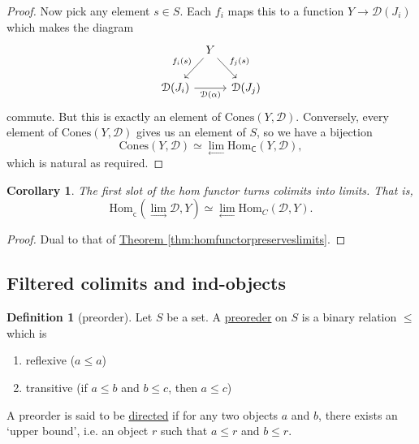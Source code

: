 \documentclass[a4paper,10pt]{scrreprt}
\newcommand{\defn}[1]{\ul{#1}}
\newcommand{\Hom}{\mathrm{Hom}}
\theoremstyle{definition}
\newtheorem{definition}{Definition}[section]
\theoremstyle{plain}
\newtheorem{corollary}{Corollary}[section]
\theoremstyle{remark}
\begin{document}
\begin{proof}
  Now pick any element $s \in S$. Each $f_{i}$ maps this to a function $Y \to \mathcal{D}(J_{i})$ which makes the diagram
  \begin{equation*}
    \begin{tikzcd}[column sep=tiny]
      & Y
      \arrow[dl, swap, "f_{i}(s)"]
      \arrow[dr, "f_{j}(s)"]
      \\
      \mathcal{D}(J_{i})
      \arrow[rr, swap, "\mathcal{D}(\alpha)"]
      & & \mathcal{D}(J_{j})
    \end{tikzcd}
  \end{equation*}
  commute. But this is exactly an element of $\mathrm{Cones}(Y, \mathcal{D})$. Conversely, every element of $\mathrm{Cones}(Y, \mathcal{D})$ gives us an element of $S$, so we have a bijection 
  \begin{equation*}
    \mathrm{Cones}(Y, \mathcal{D}) \simeq \lim_{\leftarrow} \Hom_{\mathsf{C}}(Y, \mathcal{D}),
  \end{equation*}
  which is natural as required.
\end{proof}

\begin{corollary}
  The first slot of the hom functor turns colimits into limits. That is, 
  \begin{equation*}
    \Hom_{_\mathsf{C}}(\lim_{\rightarrow}\mathcal{D}, Y) \simeq \lim_{\leftarrow}\Hom_{C}(\mathcal{D}, Y).
  \end{equation*}
\end{corollary}
\begin{proof}
  Dual to that of \hyperref[thm:homfunctorpreserveslimits]{Theorem \ref*{thm:homfunctorpreserveslimits}}.
\end{proof}


\subsection{Filtered colimits and ind-objects}
\begin{definition}[preorder]
  \label{def:preorder}
  Let $S$ be a set. A \defn{preoreder} on $S$ is a binary relation $\leq$ which is 
  \begin{enumerate}
    \item reflexive ($a \leq a$)

    \item transitive (if $a \leq b$ and $b \leq c$, then $a \leq c$)
  \end{enumerate}

  A preorder is said to be \defn{directed} if for any two objects $a$ and $b$, there exists an `upper bound', i.e. an object $r$ such that $a \leq r$ and $b \leq r$.
\end{definition}
\end{document}
